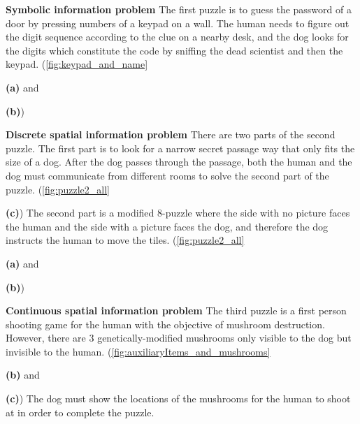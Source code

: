 \documentclass{sigchi}
\begin{document}
\begin{enumerate}

\item \textbf{Symbolic information problem}\newline
The first puzzle is to guess the password of a door by pressing numbers of a keypad on a wall.
The human needs to figure out the digit sequence according to the clue on a nearby desk, and the dog looks for the digits which constitute the code by sniffing the dead scientist and then the keypad. (\autoref{fig:keypad_and_name} {\textbf{(a)} and {\textbf{(b)})

\item \textbf{Discrete spatial information problem}\newline
There are two parts of the second puzzle.
The first part is to look for a narrow secret passage way that only fits the size of a dog.
After the dog passes through the passage, both the human and the dog must communicate from different rooms to solve the second part of the puzzle. (\autoref{fig:puzzle2_all} {\textbf{(c)})
The second part is a modified 8-puzzle where the side with no picture faces the human and the side with a picture faces the dog, and therefore the dog instructs the human to move the tiles.  (\autoref{fig:puzzle2_all} {\textbf{(a)} and {\textbf{(b)})
\item \textbf{Continuous spatial information problem}\newline
The third puzzle is a first person shooting game for the human with the objective of mushroom destruction.
However, there are 3 genetically-modified mushrooms only visible to the dog but invisible to the human. (\autoref{fig:auxiliaryItems_and_mushrooms} {\textbf{(b)} and {\textbf{(c)})
The dog must show the locations of the mushrooms for the human to shoot at in order to complete the puzzle.

}}}}}}}
\end{enumerate}
\end{document}
